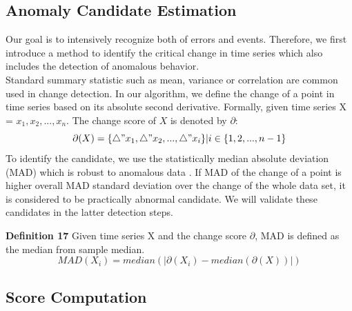 \subsection{Anomaly Candidate Estimation}
Our goal is to intensively recognize both of errors and events. Therefore, we first introduce a method to identify the critical change in time series which also includes the detection of anomalous behavior. \\
Standard summary statistic such as mean, variance or correlation are common used in change detection. In our algorithm, we define the change of a point in time series based on its absolute second derivative. Formally, given time series X = {$ x_1, x_2,..., x_n $}. The change score of $ X $ is denoted by $ \partial $:
\begin{equation}\label{anomaly_score}
\partial(X) = \{\triangle"x_1, \triangle"x_2, ... ,\triangle"x_i\} | i \in \{1,2,...,n-1\}
\end{equation}
To identify the candidate, we use the statistically median absolute deviation (MAD) which is robust to anomalous data \cite{hochenbaum2017automatic}. If MAD of the change of a point is higher overall MAD standard deviation over the change of the whole data set, it is considered to be practically abnormal candidate. We will validate these candidates in the latter detection steps.\\
\par\textbf{Definition 17} Given time series X and the change score $ \partial $, MAD is defined as the median from sample median. 
\begin{equation}
MAD(X_i) = median(|\partial(X_i) - median(\partial(X))|)
\end{equation}


\subsection{Score Computation}

